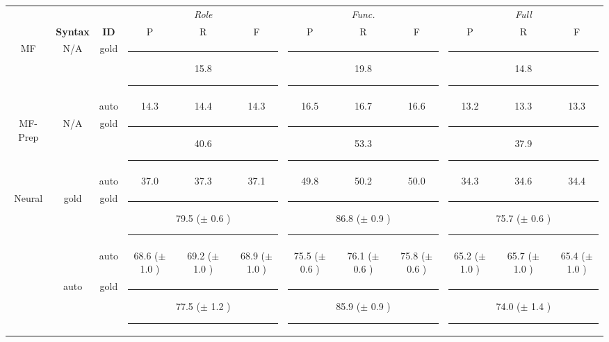 \begin{table}[]\label{tab:pssresults}
    \newcommand{\score}[2]{#1{\tiny ($\pm$#2)}}
    \newcommand{\acc}[1]{\multicolumn{3}{c|}{\textcolor{gray}{\rule[2pt]{0.5in}{0.5pt}} #1 \textcolor{gray}{\rule[2pt]{0.5in}{0.5pt}}}}
    \newcommand{\accl}[1]{\multicolumn{3}{c}{\textcolor{gray}{\rule[2pt]{0.5in}{0.5pt}} #1 \textcolor{gray}{\rule[2pt]{0.5in}{0.5pt}}}}
    \newcommand{\accs}[1]{\multicolumn{3}{c|}{\textcolor{gray}{\rule[2pt]{0.3in}{0.5pt}} #1 \textcolor{gray}{\rule[2pt]{0.3in}{0.5pt}}}}
    \newcommand{\accsl}[1]{\multicolumn{3}{c}{\textcolor{gray}{\rule[2pt]{0.3in}{0.5pt}} #1 \textcolor{gray}{\rule[2pt]{0.3in}{0.5pt}}}}

	\centering\footnotesize
    \setlength{\tabcolsep}{1pt} %
    \renewcommand{\arraystretch}{1} %
	\begin{tabular}{@{}ccc<{\hspace{5pt}}ccc|ccc|ccc@{}}
                          & &          & \multicolumn{3}{c}{\textit{Role}} & \multicolumn{3}{c}{\textit{Func.}} & \multicolumn{3}{c}{\textit{Full}}              \\
                          & \textbf{Syntax} & \textbf{ID}       & P                                 & R                                  & F    & P    & R    & F    & P    & R    & F    \\
		\midrule
        \multirow{2}{*}{MF} & \multirow{2}{*}{N/A} & gold & \acc{ 15.8 } & \acc{ 19.8 } & \accl{ 14.8 } \\
          &   & auto & 14.3 & 14.4 & 14.3 & 16.5 & 16.7 & 16.6 & 13.2 & 13.3 & 13.3 \\
        \midrule
        \multirow{2}{*}{MF-Prep} & \multirow{2}{*}{N/A} & gold & \acc{ 40.6 } & \acc{ 53.3 } & \accl{ 37.9 } \\
          &   & auto & 37.0 & 37.3 & 37.1 & 49.8 & 50.2 & 50.0 & 34.3 & 34.6 & 34.4 \\        \midrule
        \multirow{4}{*}{Neural}        & \multirow{2}{*}{gold} & gold & \accs{\score{ 79.5 }{ 0.6 } }& \accs{\score{ 86.8 }{ 0.9 } }& \accsl{\score{ 75.7 }{ 0.6 } }\\
         &   & auto & \score{ 68.6 }{ 1.0 } & \score{ 69.2 }{ 1.0 } & \score{ 68.9 }{ 1.0 } & \score{ 75.5 }{ 0.6 } & \score{ 76.1 }{ 0.6 } & \score{ 75.8 }{ 0.6 } & \score{ 65.2 }{ 1.0 } & \score{ 65.7 }{ 1.0 } & \score{ 65.4 }{ 1.0 } \\
         \cmidrule{2-12}                & \multirow{2}{*}{auto} & gold & \accs{\score{ 77.5 }{ 1.2 } } & \accs{\score{ 85.9 }{ 0.9 } }& \accsl{\score{ 74.0 }{ 1.4 } }\\

\end{tabular}
\end{table}

